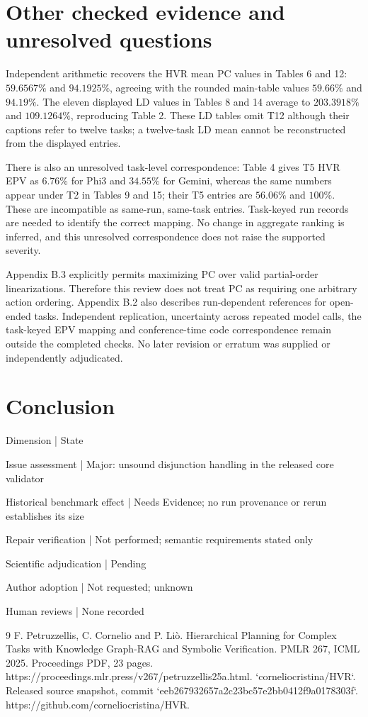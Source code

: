 \documentclass[10pt]{article}
\begin{document}
\section*{Other checked evidence and unresolved questions}
Independent arithmetic recovers the HVR mean PC values in Tables 6 and 12: \(59.6567\%\) and \(94.1925\%\), agreeing with the rounded main-table values \(59.66\%\) and \(94.19\%\). The eleven displayed LD values in Tables 8 and 14 average to \(203.3918\%\) and \(109.1264\%\), reproducing Table 2. These LD tables omit T12 although their captions refer to twelve tasks; a twelve-task LD mean cannot be reconstructed from the displayed entries.\par
There is also an unresolved task-level correspondence: Table 4 gives T5 HVR EPV as \(6.76\%\) for Phi3 and \(34.55\%\) for Gemini, whereas the same numbers appear under T2 in Tables 9 and 15; their T5 entries are \(56.06\%\) and \(100\%\). These are incompatible as same-run, same-task entries. Task-keyed run records are needed to identify the correct mapping. No change in aggregate ranking is inferred, and this unresolved correspondence does not raise the supported severity.\par
Appendix B.3 explicitly permits maximizing PC over valid partial-order linearizations. Therefore this review does not treat PC as requiring one arbitrary action ordering. Appendix B.2 also describes run-dependent references for open-ended tasks. Independent replication, uncertainty across repeated model calls, the task-keyed EPV mapping and conference-time code correspondence remain outside the completed checks. No later revision or erratum was supplied or independently adjudicated.\par
\section*{Conclusion}
Dimension | State\par
Issue assessment | Major: unsound disjunction handling in the released core validator\par
Historical benchmark effect | Needs Evidence; no run provenance or rerun establishes its size\par
Repair verification | Not performed; semantic requirements stated only\par
Scientific adjudication | Pending\par
Author adoption | Not requested; unknown\par
Human reviews | None recorded\par
9 F. Petruzzellis, C. Cornelio and P. Liò. Hierarchical Planning for Complex Tasks with Knowledge Graph-RAG and Symbolic Verification. PMLR 267, ICML 2025. Proceedings PDF, 23 pages. https://proceedings.mlr.press/v267/petruzzellis25a.html. `corneliocristina/HVR`. Released source snapshot, commit `eeb267932657a2c23bc57e2bb0412f9a0178303f`. https://github.com/corneliocristina/HVR.\par
\end{document}
